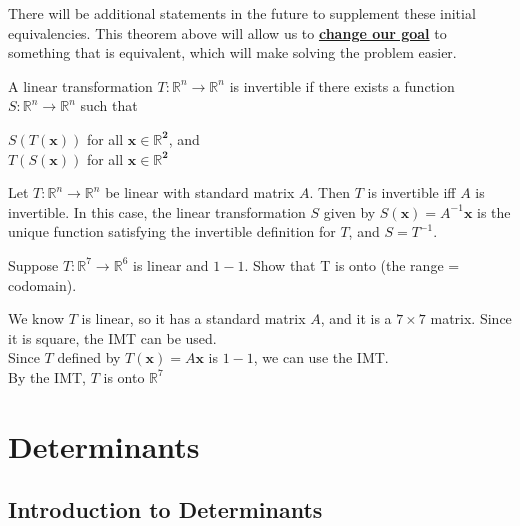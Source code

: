 \documentclass{report}
\begin{document}
There will be additional statements in the future to supplement these initial equivalencies. This theorem above will allow us to \textbf{\underline{change our goal}} to something that is equivalent, which will make solving the problem easier.

\begin{definition}
A linear transformation $T:\mathbb{R}^n\rightarrow \mathbb{R}^n$ is invertible if there exists a function $S:\mathbb{R}^n\rightarrow \mathbb{R}^n$ such that\\
\begin{center}
	$S(T(\mathbf{x}))$ for all $\mathbf{x\in \mathbb{R}^2}$, and\\
	$T(S(\mathbf{x}))$ for all $\mathbf{x\in \mathbb{R}^2}$
\end{center}
\end{definition}

\begin{theorem}
Let $T:\mathbb{R}^n\rightarrow \mathbb{R}^n$ be linear with standard matrix $A$. Then $T$ is invertible iff $A$ is invertible. In this case, the linear transformation $S$ given by $S(\mathbf{x})=A^{-1}\mathbf{x}$ is the unique function satisfying the invertible definition for $T$, and $S=T^{-1}$.
\end{theorem}

\begin{example}
Suppose $T:\mathbb{R}^7\rightarrow \mathbb{R}^6$ is linear and $1-1$. Show that T is onto (the range = codomain).\vspace{2mm}
\begin{center}
We know $T$ is linear, so it has a standard matrix $A$, and it is a $7\times 7$ matrix. Since it is square, the IMT can be used.\\\vspace{3mm}
Since $T$ defined by $T(\mathbf{x})=A\mathbf{x}$ is $1-1$, we can use the IMT.\\\vspace{3mm}
By the IMT, $T$ is onto $\mathbb{R}^7$
\end{center}
\end{example}

\chapter{Determinants}
\section{Introduction to Determinants}
\end{document}
